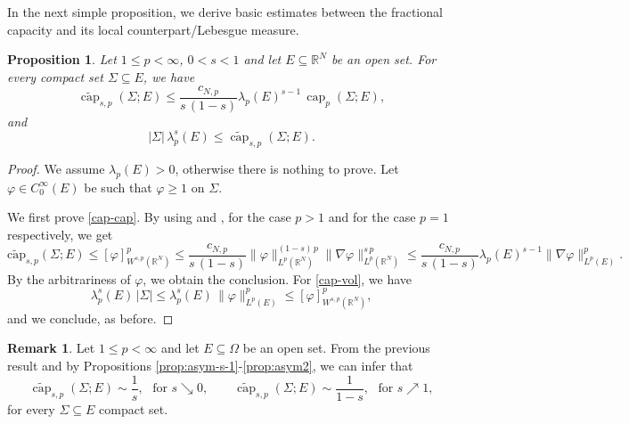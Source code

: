 \documentclass{amsart}
\newtheorem{proposition}[theorem]{Proposition}
\theoremstyle{definition}
\newtheorem{remark}[theorem]{Remark}
\numberwithin{equation}{section}
\begin{document}
In the next simple proposition, we derive basic estimates between the fractional capacity and its local counterpart/Lebesgue measure. 
\begin{proposition}   \label{prop:cap-s-1}
	Let $1 \le p < \infty$, $0 < s< 1$ and let $E\subseteq\mathbb{R}^N$ be an open set. For every compact set $\Sigma\subseteq E$, we have  
	\begin{equation} \label{cap-cap}
		\widetilde{\operatorname{cap}}_{s,p}(\Sigma;E)\leq \frac{c_{N,p}}{s\,(1-s)} \lambda_{p}(E)^{s-1}\,\operatorname{cap}_{p}(\Sigma;E),
	\end{equation}
	and 
	\begin{equation} \label{cap-vol}
		|\Sigma|\,\lambda_{p}^s(E) \le \widetilde{\operatorname{cap}}_{s,p}(\Sigma; E).
	\end{equation}
\end{proposition}
\begin{proof}
	We assume $\lambda_{p}(E) > 0$, otherwise there is nothing to prove. Let $\varphi\in C^{\infty}_0(E)$ be such that $\varphi\geq1$ on $\Sigma.$ 
	\par 
	We first prove \eqref{cap-cap}. By using \cite[Corollary 2.2]{BPS} and \cite[Proposition 4.2]{BLP}, for the case $p>1$ and for the case $p=1$ respectively, we get  
	\[
	\widetilde{\mathrm{cap}}_{s,p}(\Sigma; E) \le [\varphi]_{W^{s,p}(\mathbb{R}^N)}^p\leq\frac{c_{N,p}}{s\,(1-s)}\|\varphi\|^{(1-s)\,p}_{L^p(\mathbb{R}^N)}\|\nabla\varphi\|^{s\,p}_{L^p(\mathbb{R}^N)} \le \frac{c_{N,p}}{s\,(1-s)} \lambda_{p}(E)^{s-1} \|\nabla \varphi\|^p_{L^p(E)}.
	\]
	By the arbitrariness of $\varphi$, we obtain the conclusion.
	For \eqref{cap-vol},  we have 
	\[
	\lambda_{p}^s(E)\,|\Sigma|\leq \lambda_{p}^s(E)\, \|\varphi\|^p_{L^p(E)} \le [\varphi]_{W^{s,p}(\mathbb{R}^N)}^p,
	\]
	and we conclude, as before.
\end{proof}
\begin{remark} \label{rmk:asym-cap}
	Let $1 \le p < \infty$ and let $E \subseteq \Omega$ be an open set. From the previous result and by Propositions \ref{prop:asym-s-1}-\ref{prop:asym2}, we can infer that
	\begin{equation} \label{eqn:asym-sharp1}
		\widetilde{\operatorname{cap}}_{s,p}\left(\Sigma; E\right) \sim \frac{1}{s},\,\, \mbox{ for } s \searrow 0,  \qquad	\widetilde{\operatorname{cap}}_{s,p}\left(\Sigma; E\right) \sim \frac{1}{1-s}, \,\, \mbox{ for } s \nearrow 1,
	\end{equation}
	for every $\Sigma \subseteq E$ compact set. 
\end{remark}
\end{document}
